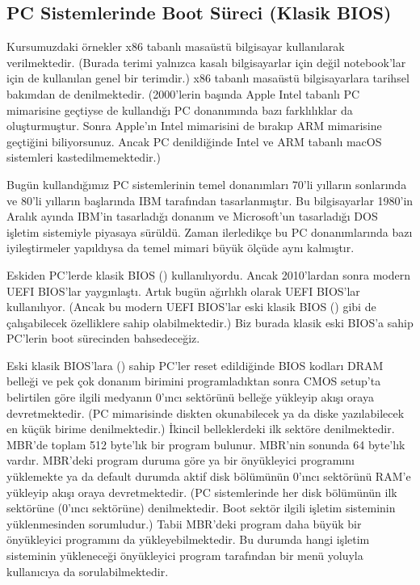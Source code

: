 \documentclass[a4paper,10pt,turkish]{sphinxmanual}
\begin{document}
\subsection{PC Sistemlerinde Boot Süreci (Klasik BIOS)}
\label{\detokenize{introduction:pc-sistemlerinde-boot-sureci-klasik-bios}}
\sphinxAtStartPar
Kursumuzdaki örnekler x86 tabanlı masaüstü bilgisayar kullanılarak verilmektedir. (Burada 
terimi yalnızca kasalı bilgisayarlar için değil notebook’lar için de kullanılan genel bir terimdir.) x86 tabanlı
masaüstü bilgisayarlara tarihsel bakımdan  de denilmektedir. (2000’lerin başında Apple
Intel tabanlı PC mimarisine geçtiyse de kullandığı PC donanımında bazı farklılıklar da oluşturmuştur. Sonra
Apple’ın Intel mimarisini de bırakıp ARM mimarisine geçtiğini biliyorsunuz. Ancak PC denildiğinde Intel ve ARM
tabanlı macOS sistemleri kastedilmemektedir.)

\sphinxAtStartPar
Bugün kullandığımız PC sistemlerinin temel donanımları 70’li yılların sonlarında ve 80’li yılların başlarında IBM
tarafından tasarlanmıştır. Bu bilgisayarlar 1980’in Aralık ayında IBM’in tasarladığı donanım ve Microsoft’un
tasarladığı DOS işletim sistemiyle piyasaya sürüldü. Zaman ilerledikçe bu PC donanımlarında bazı iyileştirmeler
yapıldıysa da temel mimari büyük ölçüde aynı kalmıştır.

\sphinxAtStartPar
Eskiden PC’lerde klasik BIOS () kullanılıyordu. Ancak 2010’lardan sonra modern UEFI BIOS’lar
yaygınlaştı. Artık bugün ağırlıklı olarak UEFI BIOS’lar kullanılıyor. (Ancak bu modern UEFI BIOS’lar eski klasik
BIOS () gibi de çalışabilecek özelliklere sahip olabilmektedir.) Biz burada klasik eski BIOS’a sahip
PC’lerin boot sürecinden bahsedeceğiz.

\sphinxAtStartPar
Eski klasik BIOS’lara () sahip PC’ler reset edildiğinde BIOS kodları DRAM belleği ve pek çok donanım
birimini programladıktan sonra CMOS setup’ta belirtilen  göre ilgili medyanın
0’ıncı sektörünü belleğe yükleyip akışı oraya devretmektedir. (PC mimarisinde diskten okunabilecek ya da diske
yazılabilecek en küçük birime  denilmektedir.) İkincil belleklerdeki ilk sektöre  denilmektedir. MBR’de toplam 512 byte’lık bir program bulunur. MBR’nin sonunda 64 byte’lık  vardır. MBR’deki program duruma göre ya bir önyükleyici programını
yüklemekte ya da default durumda aktif disk bölümünün 0’ıncı sektörünü RAM’e yükleyip akışı oraya devretmektedir.
(PC sistemlerinde her disk bölümünün ilk sektörüne (0’ıncı sektörüne)  denilmektedir. Boot sektör
ilgili işletim sisteminin yüklenmesinden sorumludur.) Tabii MBR’deki program daha büyük bir önyükleyici programını
da yükleyebilmektedir. Bu durumda hangi işletim sisteminin yükleneceği önyükleyici program tarafından bir menü
yoluyla kullanıcıya da sorulabilmektedir.
\end{document}
